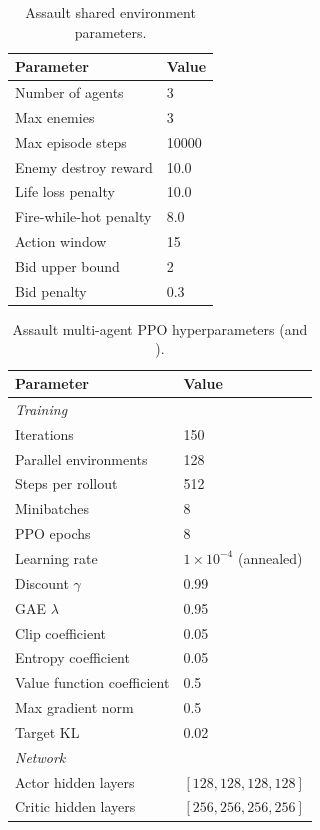 \begin{table}[h]
\caption{Assault shared environment parameters.}
\label{tab:assault-env-params}
\centering
\begin{tabular}{ll}
\toprule
Parameter & Value \\
\midrule
Number of agents & 3 \\
Max enemies & 3 \\
Max episode steps & 10000 \\
Enemy destroy reward & 10.0 \\
Life loss penalty & 10.0 \\
Fire-while-hot penalty & 8.0 \\
Action window & 15 \\
Bid upper bound & 2 \\
Bid penalty & 0.3 \\
\bottomrule
\end{tabular}
\end{table}

\begin{table}[h]
\caption{Assault multi-agent PPO hyperparameters (\allpay and \poorman).}
\label{tab:assault-mappo-hparams}
\centering
\begin{tabular}{ll}
\toprule
Parameter & Value \\
\midrule
\multicolumn{2}{l}{\textit{Training}} \\
Iterations & 150 \\
Parallel environments & 128 \\
Steps per rollout & 512 \\
Minibatches & 8 \\
PPO epochs & 8 \\
Learning rate & $1 \times 10^{-4}$ (annealed) \\
Discount $\gamma$ & 0.99 \\
GAE $\lambda$ & 0.95 \\
Clip coefficient & 0.05 \\
Entropy coefficient & 0.05 \\
Value function coefficient & 0.5 \\
Max gradient norm & 0.5 \\
Target KL & 0.02 \\
\midrule
\multicolumn{2}{l}{\textit{Network}} \\
Actor hidden layers & $[128, 128, 128, 128]$ \\
Critic hidden layers & $[256, 256, 256, 256]$ \\
\bottomrule
\end{tabular}
\end{table}


